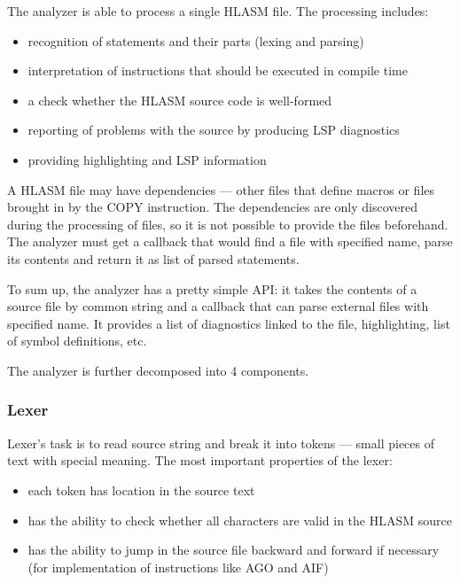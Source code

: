 The analyzer is able to process a single HLASM file. The processing includes:
\begin{itemize}
 \item recognition of statements and their parts (lexing and parsing)
 \item interpretation of instructions that should be executed in compile time
 \item a check whether the HLASM source code is well-formed
 \item reporting of problems with the source by producing LSP diagnostics
 \item providing highlighting and LSP information
\end{itemize}

A HLASM file may have dependencies --- other files that define macros or files brought in by the COPY instruction. The dependencies are only discovered during the processing of files, so it is not possible to provide the files beforehand. The analyzer must get a callback that would find a file with specified name, parse its contents and return it as list of parsed statements. 

To sum up, the analyzer has a pretty simple API: it takes the contents of a source file by common string and a callback that can parse external files with specified name. It provides a list of diagnostics linked to the file, highlighting, list of symbol definitions, etc.

The analyzer is further decomposed into 4 components.

\subsubsection{Lexer}

Lexer's task is to read source string and break it into tokens --- small pieces of text with special meaning. The most important properties of the lexer:
\begin{itemize}
	\item each token has location in the source text
	\item has the ability to check whether all characters are valid in the HLASM source
	\item has the ability to jump in the source file backward and forward if necessary (for implementation of instructions like AGO and AIF)
\end{itemize}


